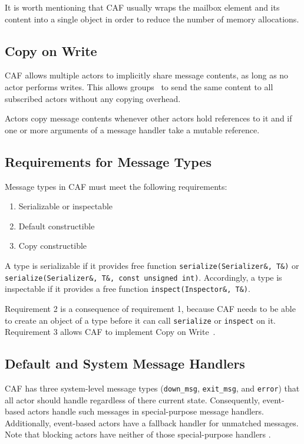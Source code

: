 It is worth mentioning that CAF usually wraps the mailbox element and its
content into a single object in order to reduce the number of memory
allocations.

\subsection{Copy on Write}
\label{copy-on-write}

CAF allows multiple actors to implicitly share message contents, as long as no
actor performs writes. This allows groups~ to send the same content
to all subscribed actors without any copying overhead.

Actors copy message contents whenever other actors hold references to it and if
one or more arguments of a message handler take a mutable reference.

\subsection{Requirements for Message Types}

Message types in CAF must meet the following requirements:

\begin{enumerate}
\item Serializable or inspectable 
\item Default constructible
\item Copy constructible
\end{enumerate}

A type is serializable if it provides free function \lstinline^serialize(Serializer&, T&)^ or \lstinline^serialize(Serializer&, T&, const unsigned int)^. Accordingly, a type is inspectable if it provides a free function \lstinline^inspect(Inspector&, T&)^.

Requirement 2 is a consequence of requirement 1, because CAF needs to be able
to create an object of a type before it can call \lstinline^serialize^ or
\lstinline^inspect^ on it. Requirement 3 allows CAF to implement Copy on
Write~.

\subsection{Default and System Message Handlers}
\label{special-handler}

CAF has three system-level message types (\lstinline^down_msg^,
\lstinline^exit_msg^, and \lstinline^error^) that all actor should handle
regardless of there current state. Consequently, event-based actors handle such
messages in special-purpose message handlers. Additionally, event-based actors
have a fallback handler for unmatched messages. Note that blocking actors have
neither of those special-purpose handlers .

